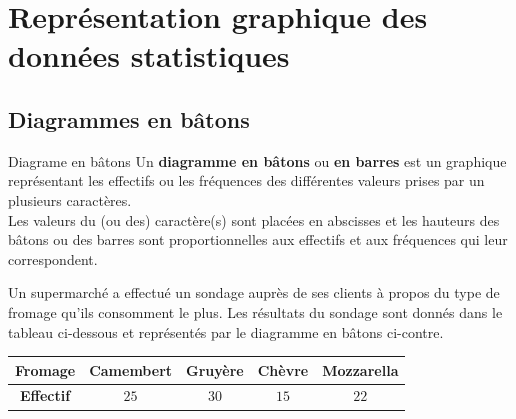 \documentclass[11pt]{article}
\begin{document}
\section{Représentation graphique des données statistiques}
\subsection{Diagrammes en b\^atons}
\begin{defi}{Diagrame en b\^atons}
  Un \textbf{diagramme en b\^atons} ou \textbf{en barres} est un graphique
  représentant les effectifs ou les fréquences des différentes valeurs prises
  par un plusieurs caractères.\\
  Les valeurs du (ou des) caractère(s) sont placées en abscisses et les hauteurs
  des b\^atons ou des barres sont proportionnelles aux effectifs et aux
  fréquences qui leur correspondent.
\end{defi}

\begin{exemple}
  \begin{minipage}{.62\textwidth}
    Un supermarché a effectué un sondage auprès de ses clients à propos du type
    de fromage qu'ils consomment le plus. Les résultats du sondage sont donnés
    dans le tableau ci-dessous et représentés par le diagramme en b\^atons
    ci-contre.
    \begin{center}
      \begin{tabular}[]{|c|c|c|c|c|}
        \hline
        \textbf{Fromage} & Camembert & Gruyère & Chèvre & Mozzarella \\
        \hline
        \textbf{Effectif} & $25$ & $30$ & $15$ & $22$ \\
        \hline
      \end{tabular}
    \end{center}
  \end{minipage}
  \begin{minipage}{.38\textwidth}
\begin{center}
\end{center}
  \end{minipage}
\end{exemple}
\end{document}
